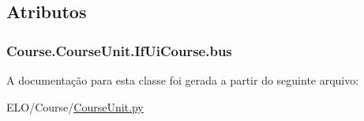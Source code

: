 \subsection{Atributos}
\hypertarget{classCourse_1_1CourseUnit_1_1IfUiCourse_a228fc709b99da3a7e6f5020bd07cee03}{
\subsubsection[{bus}]{\setlength{\rightskip}{0pt plus 5cm}Course.\-Course\-Unit.\-If\-Ui\-Course.\-bus}}\label{classCourse_1_1CourseUnit_1_1IfUiCourse_a228fc709b99da3a7e6f5020bd07cee03}


A documentação para esta classe foi gerada a partir do seguinte arquivo\-:\begin{DoxyCompactItemize}
\item 
E\-L\-O/\-Course/\hyperlink{CourseUnit_8py}{Course\-Unit.\-py}\end{DoxyCompactItemize}
